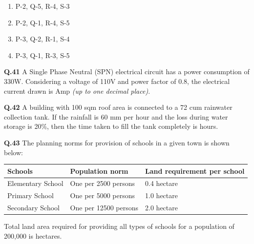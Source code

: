 \documentclass[journal,12pt,onecolumn]{IEEEtran}
\theoremstyle{remark}
\begin{document}
\begin{multicols}{2}
\begin{enumerate}[label=(\Alph*)]
\item P-2, Q-5, R-4, S-3
\item P-2, Q-1, R-4, S-5
\item P-3, Q-2, R-1, S-4
\item P-3, Q-1, R-3, S-5
\end{enumerate}
\end{multicols}

\vspace{1cm}

\noindent
\textbf{Q.41} \hspace{0.15cm}  A Single Phase Neutral (SPN) electrical circuit has a power consumption of 330W. Considering a voltage of 110V and power factor of 0.8, the electrical current drawn is \underline{\hspace{3cm}} Amp \emph{(up to one decimal place)}.

\vspace{1cm}

\noindent
\textbf{Q.42}\hspace{0.15cm} A building with 100 sqm roof area is connected to a 72 cum rainwater collection tank. If the rainfall is 60 mm per hour and the loss during water storage is 20\%, then the time taken to fill the tank completely is \underline{\hspace{3cm}} hours.

\vspace{1cm}

\noindent
\textbf{Q.43}\hspace{0.15cm} The planning norms for provision of schools in a given town is shown below:

\begin{table}[h!]
\centering
\begin{tabular}{|l|l|l|}
\hline
\textbf{Schools} & \textbf{Population norm} & \textbf{Land requirement per school} \\
\hline
Elementary School & One per 2500 persons & 0.4 hectare \\
Primary School    & One per 5000 persons & 1.0 hectare \\
Secondary School  & One per 12500 persons & 2.0 hectare \\
\hline
\end{tabular}
\end{table}

\noindent \hspace{1cm}\parbox[t]{13cm}{
Total land area required for providing all types of schools for a population of 200,000 is \underline{\hspace{3cm}} hectares.}
\end{document}
